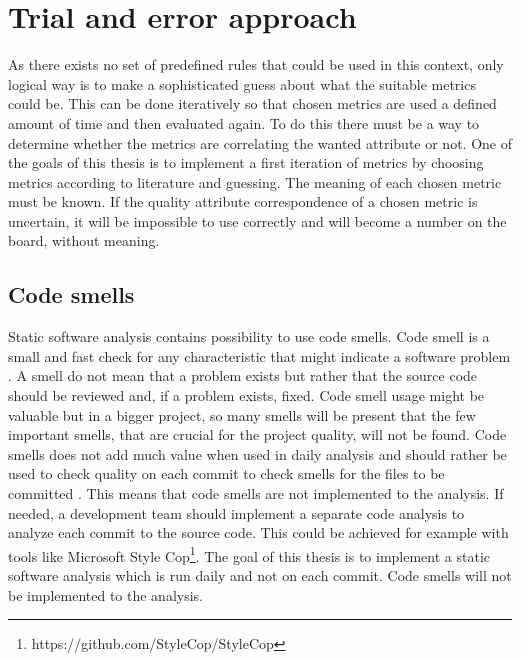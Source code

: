 %

\section{Trial and error approach}

As there exists no set of predefined rules that could be used in this context, only logical way is to make a sophisticated guess about what the suitable metrics could be. This can be done iteratively so that chosen metrics are used a defined amount of time and then evaluated again. To do this there must be a way to determine whether the metrics are correlating the wanted attribute or not. One of the goals of this thesis is to implement a first iteration of metrics by choosing metrics according to literature and guessing. The meaning of each chosen metric must be known. If the quality attribute correspondence of a chosen metric is uncertain, it will be impossible to use correctly and will become a number on the board, without meaning.

\subsection{Code smells}
\label{chap:codesmells}

Static software analysis contains possibility to use code smells. Code smell is a small and fast check for any characteristic that might indicate a software problem \cite{fowlercodesmell}. A smell do not mean that a problem exists but rather that the source code should be reviewed and, if a problem exists, fixed. Code smell usage might be valuable but in a bigger project, so many smells will be present that the few important smells, that are crucial for the project quality, will not be found. Code smells does not add much value when used in daily analysis and should rather be used to check quality on each commit to check smells for the files to be committed \cite{tufano2015and}. This means that code smells are not implemented to the analysis. If needed, a development team should implement a separate code analysis to analyze each commit to the source code. This could be achieved for example with tools like Microsoft Style Cop\footnote{https://github.com/StyleCop/StyleCop}. The goal of this thesis is to implement a static software analysis which is run daily and not on each commit. Code smells will not be implemented to the analysis. 

